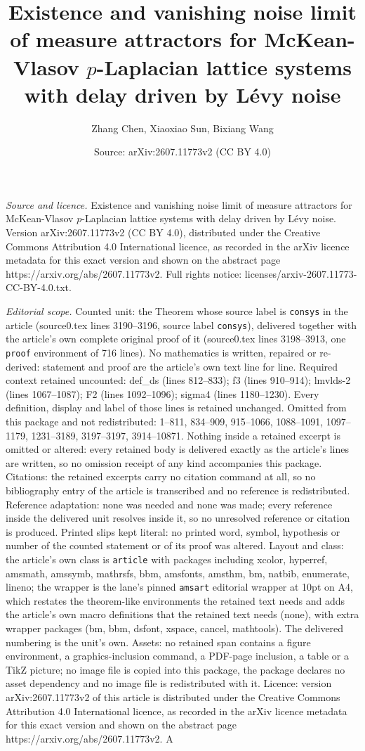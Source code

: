 \documentclass[10pt,a4paper]{amsart}
\title[Existence and vanishing noise limit of measure attractors fo]{Existence and vanishing noise limit of measure attractors for McKean-Vlasov $p$-Laplacian lattice systems with delay driven by L\'evy noise}
\author{Zhang Chen, Xiaoxiao Sun, Bixiang Wang}
\date{Source: arXiv:2607.11773v2 (CC BY 4.0)}
\begin{document}
\maketitle

\noindent\emph{Source and licence.} Existence and vanishing noise limit of measure attractors for McKean-Vlasov $p$-Laplacian lattice systems with delay driven by L\'evy noise. Version arXiv:2607.11773v2 (CC BY 4.0), distributed under the Creative Commons Attribution 4.0 International licence, as recorded in the arXiv licence metadata for this exact version and shown on the abstract page https://arxiv.org/abs/2607.11773v2. Full rights notice: licenses/arxiv-2607.11773-CC-BY-4.0.txt.\par\smallskip

\noindent\textit{Editorial scope.} Counted unit: the Theorem whose source label is \texttt{consys} in the article (source0.tex lines 3190--3196, source label \texttt{consys}), delivered together with the article's own complete original proof of it (source0.tex lines 3198--3913, one \texttt{proof} environment of 716 lines). No mathematics is written, repaired or re-derived: statement and proof are the article's own text line for line. Required context retained uncounted: def\_ds (lines 812--833); f3 (lines 910--914); lmvlds-2 (lines 1067--1087); F2 (lines 1092--1096); sigma4 (lines 1180--1230). Every definition, display and label of those lines is retained unchanged. Omitted from this package and not redistributed: 1--811, 834--909, 915--1066, 1088--1091, 1097--1179, 1231--3189, 3197--3197, 3914--10871. Nothing inside a retained excerpt is omitted or altered: every retained body is delivered exactly as the article's lines are written, so no omission receipt of any kind accompanies this package. Citations: the retained excerpts carry no citation command at all, so no bibliography entry of the article is transcribed and no reference is redistributed. Reference adaptation: none was needed and none was made; every reference inside the delivered unit resolves inside it, so no unresolved reference or citation is produced. Printed slips kept literal: no printed word, symbol, hypothesis or number of the counted statement or of its proof was altered. Layout and class: the article's own class is \texttt{article} with packages including xcolor, hyperref, amsmath, amssymb, mathrsfs, bbm, amsfonts, amsthm, bm, natbib, enumerate, lineno; the wrapper is the lane's pinned \texttt{amsart} editorial wrapper at 10pt on A4, which restates the theorem-like environments the retained text needs and adds the article's own macro definitions that the retained text needs (none), with extra wrapper packages (bm, bbm, dsfont, xspace, cancel, mathtools). The delivered numbering is the unit's own. Assets: no retained span contains a figure environment, a graphics-inclusion command, a PDF-page inclusion, a table or a TikZ picture; no image file is copied into this package, the package declares no asset dependency and no image file is redistributed with it. Licence: version arXiv:2607.11773v2 of this article is distributed under the Creative Commons Attribution 4.0 International licence, as recorded in the arXiv licence metadata for this exact version and shown on the abstract page https://arxiv.org/abs/2607.11773v2. A 
\end{document}
